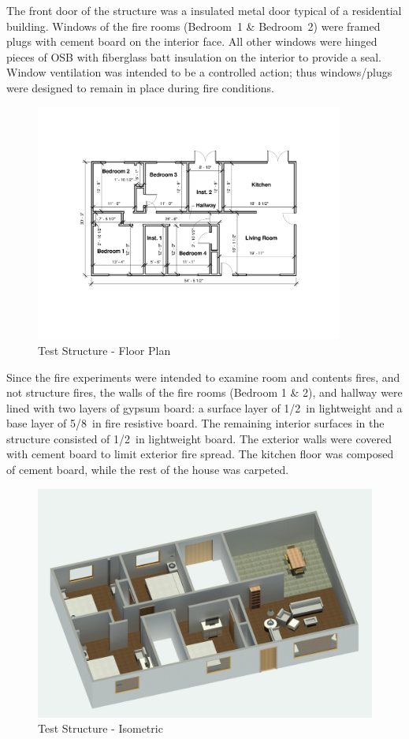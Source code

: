 \documentclass[12pt,oneside]{book}
\begin{document}
The front door of the structure was a insulated metal door typical of a residential building. Windows of the fire rooms (Bedroom~1 \& Bedroom~2) were framed plugs with cement board on the interior face. All other windows were hinged pieces of OSB with fiberglass batt insulation on the interior to provide a seal. Window ventilation was intended to be a controlled action; thus windows/plugs were designed to remain in place during fire conditions. 
 
\begin{figure}[H]
\centering
\includegraphics[width=0.9\textwidth]{0_Images/Ranch_Pictures/Floor_Plan}
\caption{Test Structure - Floor Plan}
\label{figure:ranchexp1_floorplan}{}
\end{figure}

Since the fire experiments were intended to examine room and contents fires, and not structure fires, the walls of the fire rooms (Bedroom 1 \& 2), and hallway were lined with two layers of gypsum board: a surface layer of 1/2~in lightweight and a base layer of 5/8~in fire resistive board. The remaining interior surfaces in the structure consisted of 1/2~in lightweight board. The exterior walls were covered with cement board to limit exterior fire spread. The kitchen floor was composed of cement board, while the rest of the house was carpeted. 

\begin{figure}[H]
\centering
\includegraphics[width=.65\textwidth]{0_Images/Ranch_Pictures/Report_ISO_Furniture.jpg}
\caption{Test Structure - Isometric}
\label{figure:ranchexp3_floorplan}
\end{figure}
\end{document}
